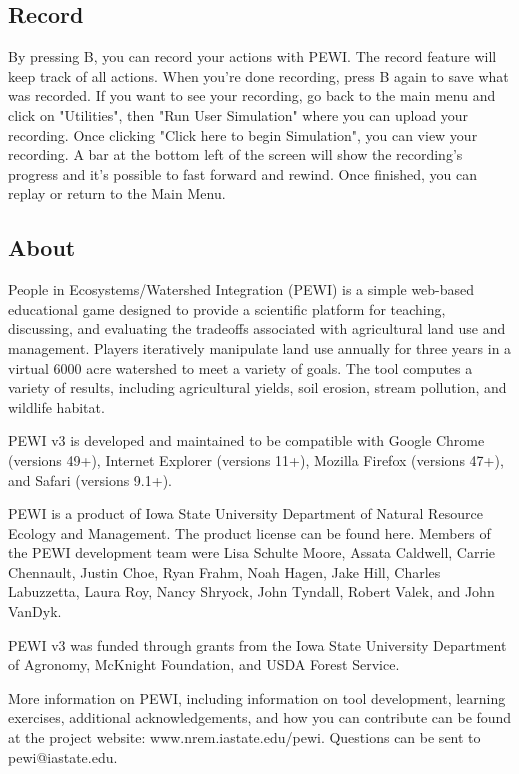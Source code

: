 \documentclass[11pt]{article}
\begin{document}
\begin{itemize}
\subsection{Record}
By pressing B, you can record your actions with PEWI. The record feature will keep track of all actions. When you're done recording, press B again to save what was recorded. If you want to see your recording, go back to the main menu and click on "Utilities", then "Run User Simulation" where you can upload your recording. Once clicking "Click here to begin Simulation", you can view your recording. A bar at the bottom left of the screen will show the recording's progress and it's possible to fast forward and rewind. Once finished, you can replay or return to the Main Menu. 

\subsection{About}
People in Ecosystems/Watershed Integration (PEWI) is a simple web-based educational game designed to provide a scientific platform for teaching, discussing, and evaluating the tradeoffs associated with agricultural land use and management. Players iteratively manipulate land use annually for three years in a virtual 6000 acre watershed to meet a variety of goals. The tool computes a variety of results, including agricultural yields, soil erosion, stream pollution, and wildlife habitat.

PEWI v3 is developed and maintained to be compatible with Google Chrome (versions 49+), Internet Explorer (versions 11+), Mozilla Firefox (versions 47+), and Safari (versions 9.1+).

PEWI is a product of Iowa State University Department of Natural Resource Ecology and Management. The product license can be found here. Members of the PEWI development team were Lisa Schulte Moore, Assata Caldwell, Carrie Chennault, Justin Choe, Ryan Frahm, Noah Hagen, Jake Hill, Charles Labuzzetta, Laura Roy, Nancy Shryock, John Tyndall, Robert Valek, and John VanDyk.

PEWI v3 was funded through grants from the Iowa State University Department of Agronomy, McKnight Foundation, and USDA Forest Service.

More information on PEWI, including information on tool development, learning exercises, additional acknowledgements, and how you can contribute can be found at the project website: www.nrem.iastate.edu/pewi. Questions can be sent to pewi@iastate.edu. 
\begin{thebibliography}{1}


\end{thebibliography}
\end{itemize}
\end{document}
